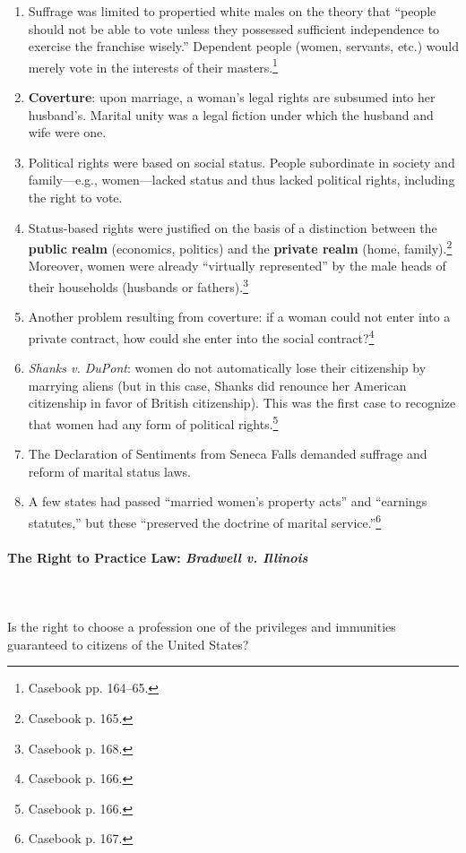 \begin{enumerate}
    \item Suffrage was limited to propertied white males on the theory that 
    ``people should not be able to vote unless they possessed sufficient 
    independence to exercise the franchise wisely.'' Dependent people (women, 
    servants, etc.) would merely vote in the interests of their 
    masters.\footnote{Casebook pp. 164--65.}
    \item \textbf{Coverture}: upon marriage, a woman's legal rights are 
    subsumed into her husband's. Marital unity was a legal fiction under which 
    the husband and wife were one.
    \item Political rights were based on social status. People subordinate in 
    society and family---e.g., women---lacked status and thus lacked political 
    rights, including the right to vote.
    \item Status-based rights were justified on the basis of a distinction 
    between the \textbf{public realm} (economics, politics) and the 
    \textbf{private realm} (home, family).\footnote{Casebook p. 165.} 
    Moreover, women were already ``virtually represented'' by the male heads 
    of their households (husbands or fathers).\footnote{Casebook p. 168.}
    \item Another problem resulting from coverture: if a woman could not enter 
    into a private contract, how could she enter into the social 
    contract?\footnote{Casebook p. 166.}
    \item \emph{Shanks v. DuPont}: women do not automatically lose their 
    citizenship by marrying aliens (but in this case, Shanks did renounce her 
    American citizenship in favor of British citizenship). This was the first 
    case to recognize that women had any form of political 
    rights.\footnote{Casebook p. 166.}
    \item The Declaration of Sentiments from Seneca Falls demanded suffrage 
    and reform of marital status laws.
    \item A few states had passed ``married women's property acts'' and 
    ``earnings statutes,'' but these ``preserved the doctrine of marital 
    service.''\footnote{Casebook p. 167.}
\end{enumerate}

\paragraph{The Right to Practice Law: \emph{Bradwell v. Illinois}}
~\\\\
Is the right to choose a profession one of the privileges and immunities 
guaranteed to citizens of the United States?

